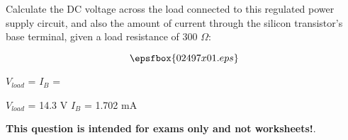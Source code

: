 

Calculate the DC voltage across the load connected to this regulated power supply circuit, and also the amount of current through the silicon transistor's base terminal, given a load resistance of 300 $\Omega$:

$$\epsfbox{02497x01.eps}$$

$V_{load}$ = \hskip 80pt $I_B$ = 







$V_{load}$ = 14.3 V \hskip 50pt $I_B$ = 1.702 mA 







{\bf This question is intended for exams only and not worksheets!}.





